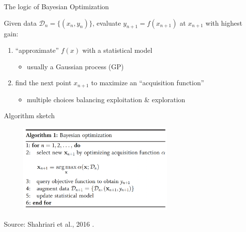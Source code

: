 \documentclass[aspectratio=169]{beamer}					%
\begin{document}
\begin{frame}{The logic of Bayesian Optimization}

Given data $\mathcal{D}_n = \{(x_n, y_n)\}$, evaluate $y_{n+1} = f(x_{n+1})$ at $x_{n+1}$ with highest gain:

	\vspace{.5em}

\begin{enumerate}
	\item ``approximate'' $f(x)$ with a statistical model
	\begin{itemize}
		\item usually a Gaussian process (GP)
	\end{itemize}
	\item find the next point $x_{n+1}$ to maximize an ``acquisition function'' 
	\begin{itemize}
		\item multiple choices balancing exploitation \& exploration
	\end{itemize}
\end{enumerate}
	
\end{frame}

\begin{frame}{Algorithm sketch}
	\begin{figure}
	\centering
	\includegraphics[width = 0.7\textwidth]{figures/Bo-alg1.png}
	\end{figure}
{
\footnotesize
Source: Shahriari et al., 2016 \cite{shahriari2015taking}. 
}

\end{frame}
\end{document}
